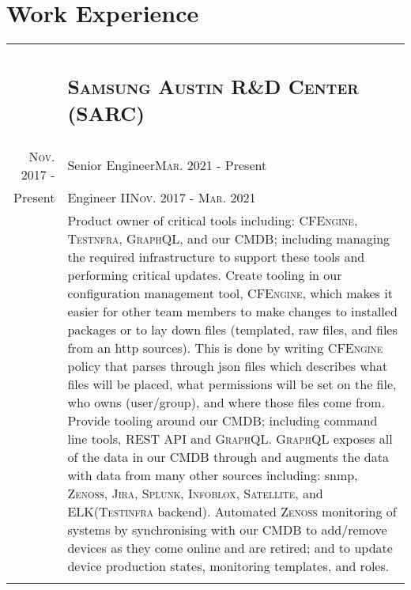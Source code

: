 \documentclass[letterpaper,10pt]{article}
\begin{document}
\section{Work Experience}
\begin{tabular}{R|p{6.2in}}

	                               & \subsection{\textsc{Samsung Austin R\&D Center (SARC)}}                                         \\

	\textsc{Nov.} 2017 -           & Senior Engineer\hfill\small{\textsc{Mar.} 2021 - Present}                                       \\
	Present\phantom{ -}            & Engineer II\hfill\small{\textsc{Nov.} 2017 - \textsc{Mar.} 2021}                                \\
	                               & \footnotesize Product owner of critical tools including: \textsc{CFEngine, Testnfra, GraphQL},
	and our CMDB; including managing the required infrastructure to support these tools and performing 	critical updates.
	Create tooling in our configuration management tool, \textsc{CFEngine}, which makes it easier for other team members
	to make changes to installed packages or to lay down files (templated, raw files, and files from an http sources).
	This is done by writing \textsc{CFEngine} policy that parses through json files which describes what files will be placed,
	what permissions will be set on the file, who owns (user/group), and where those files come from. Provide tooling around our CMDB;
	including command line tools, REST API and \textsc{GraphQL}. \textsc{GraphQL} exposes all of the data in our CMDB through and
	augments the data with data from many other sources including: snmp, \textsc{Zenoss, Jira, Splunk, Infoblox, Satellite},
	and \textsc{ELK}(\textsc{Testinfra} backend). Automated \textsc{Zenoss} monitoring of systems by synchronising with our
	CMDB to add/remove devices as they come online and are retired; and to update device production states, monitoring templates,
	and roles.                                                                                                                       \\
	                                                                                                             \\



\end{tabular}
\end{document}
